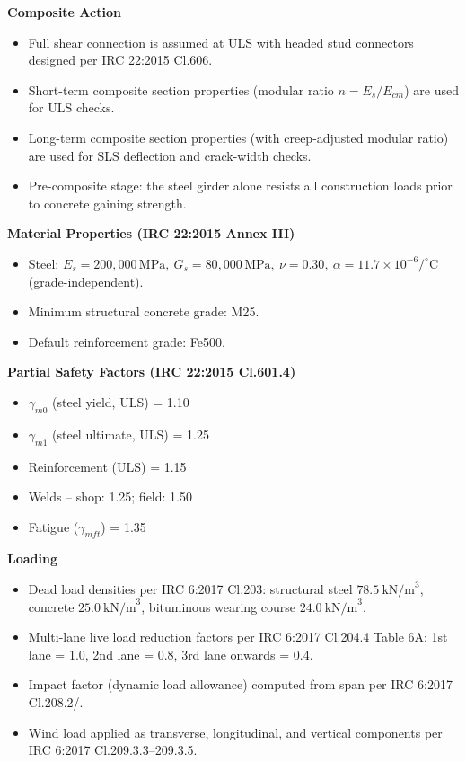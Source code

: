\documentclass[12pt,a4paper]{report}
\numberwithin{table}{chapter}
\numberwithin{figure}{chapter}
\begin{document}
\textbf{Composite Action}

\begin{itemize}
    \item Full shear connection is assumed at ULS with headed stud connectors designed per IRC 22:2015 Cl.606.
    \item Short-term composite section properties (modular ratio $n = E_s/E_{cm}$) are used for ULS checks.
    \item Long-term composite section properties (with creep-adjusted modular ratio) are used for SLS deflection and crack-width checks.
    \item Pre-composite stage: the steel girder alone resists all construction loads prior to concrete gaining strength.
\end{itemize}


\textbf{Material Properties (IRC 22:2015 Annex III)}

\begin{itemize}
\item Steel: $E_s = 200{,}000 \, \text{MPa}, \ G_s = 80{,}000 \, \text{MPa}, \ \nu = 0.30, \ \alpha = 11.7 \times 10^{-6}/^\circ\mathrm{C}$ (grade-independent).
\item Minimum structural concrete grade: M25.
\item Default reinforcement grade: Fe500.
\end{itemize}

\textbf{Partial Safety Factors (IRC 22:2015 Cl.601.4)}

\begin{itemize}
\item $\gamma_{m0}$ (steel yield, ULS) = 1.10
\item $\gamma_{m1}$ (steel ultimate, ULS) = 1.25
\item Reinforcement (ULS) = 1.15
\item Welds -- shop: 1.25; field: 1.50
\item Fatigue ($\gamma_{mft}$) = 1.35
\end{itemize}

\textbf{Loading}

\begin{itemize}
\item Dead load densities per IRC 6:2017 Cl.203: structural steel $78.5 \ \text{kN/m}^3$, concrete $25.0 \ \text{kN/m}^3$, bituminous wearing course $24.0 \ \text{kN/m}^3$.
\item Multi-lane live load reduction factors per IRC 6:2017 Cl.204.4 Table 6A: 1st lane = 1.0, 2nd lane = 0.8, 3rd lane onwards = 0.4.
\item Impact factor (dynamic load allowance) computed from span per IRC 6:2017 Cl.208.2/.
\item Wind load applied as transverse, longitudinal, and vertical components per IRC 6:2017 Cl.209.3.3--209.3.5.
\end{itemize}
\end{document}
